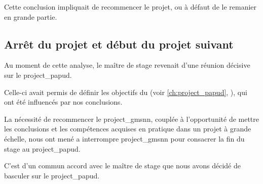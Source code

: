 Cette conclusion impliquait de recommencer le projet, ou à défaut de le remanier en grande partie.

\subsection{Arrêt du projet et début du projet suivant}
Au moment de cette analyse, le maître de stage revenait d'une réunion décisive sur le \gls{project_papud}.

Celle-ci avait permis de définir les objectifs du  (voir \autoref{ch:project_papud}, ), qui ont été influencés par nos conclusions.

La nécessité de recommencer le \gls{project_gmsnn}, couplée à l'opportunité de mettre les conclusions et les compétences acquises en pratique dans un projet à grande échelle, nous ont mené a interrompre \gls{project_gmsnn} pour consacrer la fin du stage au \gls{project_papud}.

C'est d'un commun accord avec le maître de stage que nous avons décidé de basculer sur le \gls{project_papud}.